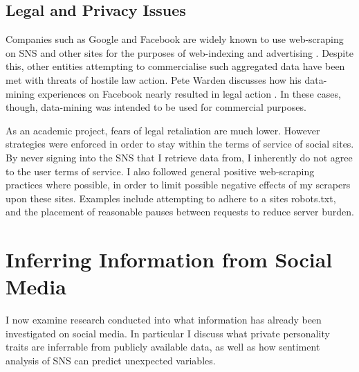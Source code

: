 


\subsection{Legal and Privacy Issues}

Companies such as Google and Facebook are widely known to use web-scraping on SNS and other sites for the purposes of web-indexing and advertising \cite{}. Despite this, other entities attempting to commercialise such aggregated data have been met with threats of hostile law action. Pete Warden discusses how his data-mining experiences on Facebook nearly resulted in legal action \cite{}. In these cases, though, data-mining was intended to be used for commercial purposes. 

As an academic project, fears of legal retaliation are much lower. However strategies were enforced in order to stay within the terms of service of social sites. By never signing into the SNS that I retrieve data from, I inherently do not agree to the user terms of service. I also followed general positive web-scraping practices where possible, in order to limit possible negative effects of my scrapers upon these sites. Examples include attempting to adhere to a sites robots.txt, and the placement of reasonable pauses between requests to reduce server burden. 

\section{Inferring Information from Social Media}

I now examine research conducted into what information has already been investigated on social media. In particular I discuss what private personality traits are inferrable from publicly available data, as well as how sentiment analysis of SNS can predict unexpected variables.

